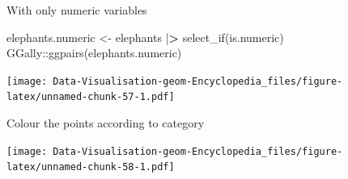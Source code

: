 \documentclass[
]{book}
\newenvironment{Shaded}{\begin{snugshade}}{\end{snugshade}}
\newcommand{\AttributeTok}[1]{\textcolor[rgb]{0.77,0.63,0.00}{#1}}
\newcommand{\ErrorTok}[1]{\textcolor[rgb]{0.64,0.00,0.00}{\textbf{#1}}}
\newcommand{\FunctionTok}[1]{\textcolor[rgb]{0.00,0.00,0.00}{#1}}
\newcommand{\NormalTok}[1]{#1}
\newcommand{\OtherTok}[1]{\textcolor[rgb]{0.56,0.35,0.01}{#1}}
\newcommand{\SpecialCharTok}[1]{\textcolor[rgb]{0.00,0.00,0.00}{#1}}
\begin{document}
With only numeric variables

\begin{Shaded}
\begin{Highlighting}[]
\NormalTok{elephants.numeric }\OtherTok{\textless{}{-}}\NormalTok{ elephants }\SpecialCharTok{|}\ErrorTok{\textgreater{}} \FunctionTok{select\_if}\NormalTok{(is.numeric)     }
\NormalTok{GGally}\SpecialCharTok{::}\FunctionTok{ggpairs}\NormalTok{(elephants.numeric)}
\end{Highlighting}
\end{Shaded}

\texttt{[image: Data-Visualisation-geom-Encyclopedia\_files/figure-latex/unnamed-chunk-57-1.pdf]}

Colour the points according to category

\begin{Shaded}
\end{Shaded}

\texttt{[image: Data-Visualisation-geom-Encyclopedia\_files/figure-latex/unnamed-chunk-58-1.pdf]}

\printbibliography
\end{document}
